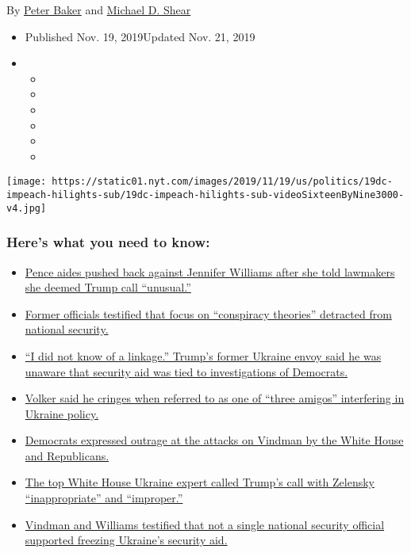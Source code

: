 By \href{https://www.nytimes.com/by/peter-baker}{Peter Baker} and
\href{https://www.nytimes.com/by/michael-d-shear}{Michael D. Shear}

\begin{itemize}
\item
  Published Nov. 19, 2019Updated Nov. 21, 2019
\item
  \begin{itemize}
  \item
  \item
  \item
  \item
  \item
  \item
  \end{itemize}
\end{itemize}

\texttt{[image: https://static01.nyt.com/images/2019/11/19/us/politics/19dc-impeach-hilights-sub/19dc-impeach-hilights-sub-videoSixteenByNine3000-v4.jpg]}

\hypertarget{heres-what-you-need-to-know}{%
\subsubsection{Here's what you need to
know:}\label{heres-what-you-need-to-know}}

\begin{itemize}
\tightlist
\item
  \protect\hyperlink{link-1d1e3b4a}{Pence aides pushed back against
  Jennifer Williams after she told lawmakers she deemed Trump call
  ``unusual.''}
\item
  \protect\hyperlink{link-59501d94}{Former officials testified that
  focus on ``conspiracy theories'' detracted from national security.}
\item
  \protect\hyperlink{link-4b9b1be1}{``I did not know of a linkage.''
  Trump's former Ukraine envoy said he was unaware that security aid was
  tied to investigations of Democrats.}
\item
  \protect\hyperlink{link-4bbceac4}{Volker said he cringes when referred
  to as one of ``three amigos'' interfering in Ukraine policy.}
\item
  \protect\hyperlink{link-21f4e4b5}{Democrats expressed outrage at the
  attacks on Vindman by the White House and Republicans.}
\item
  \protect\hyperlink{link-696ff6ae}{The top White House Ukraine expert
  called Trump's call with Zelensky ``inappropriate'' and ``improper.''}
\item
  \protect\hyperlink{link-59b176a9}{Vindman and Williams testified that
  not a single national security official supported freezing Ukraine's
  security aid.}
\end{itemize}

